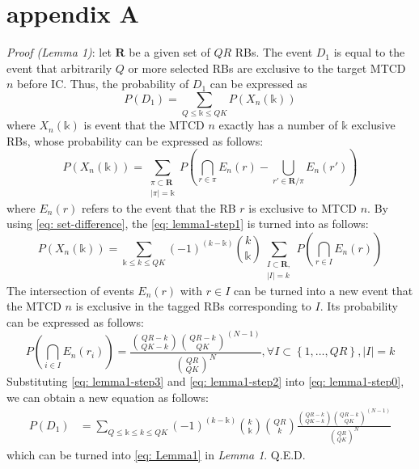\documentclass[a4paper]{IEEEtran}
\begin{document}
\section*{appendix A}
\emph{Proof (Lemma 1)}: let $\pmb{R}$ be a given set of $QR$ RBs. The event $D_1$ is equal to the event that arbitrarily $Q$ or more selected RBs are exclusive to the target MTCD $n$ before IC. Thus, the probability of $D_1$ can be expressed as
\begin{equation}
P(D_1) = \sum_{Q\leq \mathbb{k} \leq QK}P(X_{n}(\mathbb{k}))
\label{eq: lemma1-step0}
\end{equation}
where $X_{n}(\mathbb{k})$ is event that the MTCD $n$ exactly has a number of $\mathbb{k}$ exclusive RBs, whose probability can be expressed as follows:
\begin{equation}
P(X_{n}(\mathbb{k})) = 
\sum\limits_{\substack{
\pi \subset \pmb{R} \\
|\pi| = \mathbb{k}
}}
P(\bigcap_{r \in \pi} E_{n}(r) - \bigcup_{r' \in \pmb{R}/\pi} E_{n}(r'))
\label{eq: lemma1-step1}
\end{equation}
where $E_n(r)$ refers to the event that the RB $r$ is exclusive to MTCD $n$. By using \eqref{eq: set-difference}, the \eqref{eq: lemma1-step1} is turned into as follows:
\begin{equation}
P(X_{n}(\mathbb{k})) = \sum_{\mathbb{k} \leq k \leq QK}(-1)^{(k - \mathbb{k})}
{k \choose \mathbb{k}} 
\sum\limits_{\substack{I \subset \pmb{R}, \\ |I| = k }} P(\bigcap_{r \in I} E_n(r))
\label{eq: lemma1-step2}
\end{equation}
The intersection of events $E_n(r)$ with $ r\in I$ can be turned into a new event that the MTCD $n$ is exclusive in the tagged RBs corresponding to $I$. Its probability can be expressed as follows:
\begin{equation}
P(\bigcap_{i \in I} E_n(r_i)) = 
\frac{{QR - k \choose QK-k}{QR - k \choose QK}^{(N-1)}}{{QR \choose QK}^N}, \forall I \subset \left\{1, \dots, QR\right\}, |I| = k
\label{eq: lemma1-step3}
\end{equation}
Substituting \eqref{eq: lemma1-step3} and \eqref{eq: lemma1-step2} into \eqref{eq: lemma1-step0}, we can obtain a new equation as follows:
\begin{equation}
\begin{split}
P(D_1) & = \sum_{Q \leq \mathbb{k} \leq k \leq QK} (-1)^{(k - \mathbb{k})}
{k \choose \mathbb{k}} {QR \choose k} \frac{{QR - k \choose QK-k}{QR - k \choose QK}^{(N-1)}}{{QR \choose QK}^N}
\end{split}
\end{equation}
which can be turned into \eqref{eq: Lemma1} in \emph{Lemma 1}. Q.E.D.
\end{document}
